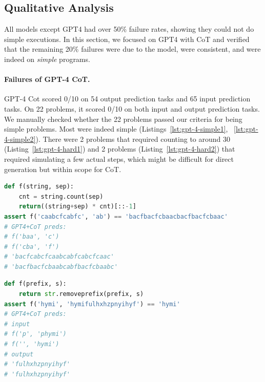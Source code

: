 \subsection{Qualitative Analysis} \label{sec:qualitative-analysis}
All models except GPT4 had over 50\% failure rates, showing they could not do simple executions.
In this section, we focused on GPT4 with CoT and verified that the remaining 20\% failures were due to the model, were consistent, and were indeed on \emph{simple} programs.

\paragraph{Failures of GPT-4 CoT.}
GPT-4 Cot scored 0/10 on 54 output prediction tasks and 65 input prediction tasks. On 22 problems, it scored 0/10 on both input and output prediction tasks.
We manually checked whether the 22 problems passed our criteria for being simple problems. Most were indeed simple (Listings~\ref{lst:gpt-4-simple1}, ~\ref{lst:gpt-4-simple2}). There were 2 problems that required counting to around 30 (Listing~\ref{lst:gpt-4-hard1}) and 2 problems (Listing~\ref{lst:gpt-4-hard2}) that required simulating a few actual steps, which might be difficult for direct generation but within scope for CoT.

\begingroup
{}

\noindent\begin{minipage}[t]{.47\textwidth} %
\vspace{0pt}
\begin{lstlisting}[caption=GPT-4 has the right idea but cannot do the string concatenation correctly,label={lst:gpt-4-simple1}, breaklines=true, language=python]
def f(string, sep):
    cnt = string.count(sep)
    return((string+sep) * cnt)[::-1]
assert f('caabcfcabfc', 'ab') == 'bacfbacfcbaacbacfbacfcbaac'
# GPT4+CoT preds:
# f('baa', 'c')
# f('cba', 'f')
# 'bacfcabcfcaabcabfcabcfcaac'
# 'bacfbacfcbaabcabfbacfcbaabc'
\end{lstlisting}
\end{minipage}\hfill
\begin{minipage}[t]{.47\textwidth} %
\vspace{0pt}
\begin{lstlisting}[caption=GPT-4 might have been misled by the variable name prefix,label={lst:gpt-4-simple2}, breaklines=true, language=python]
def f(prefix, s):
    return str.removeprefix(prefix, s)
assert f('hymi', 'hymifulhxhzpnyihyf') == 'hymi'
# GPT4+CoT preds:
# input
# f('p', 'phymi')
# f('', 'hymi')
# output
# 'fulhxhzpnyihyf'
# 'fulhxhzpnyihyf'
\end{lstlisting}
\end{minipage}


